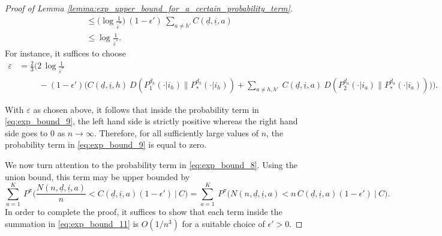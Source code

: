 \begin{proof}[Proof of Lemma \ref{lemma:exp_upper_bound_for_a_certain_probability_term}]
\begin{align}
	& \leq \bigg(\log\frac{1}{\bar{\varepsilon}^*}\bigg)~(1-\epsilon')~\sum\limits_{a\neq h'}C(\underline{d}, \underline{i}, a)\nonumber\\
	&\leq \log\frac{1}{\bar{\varepsilon}^*}.
\end{align}
For instance, it suffices to choose
\begin{align}
	\varepsilon&=\frac{2}{3}\bigg(2\,\log\frac{1}{\bar{\varepsilon}^*}\nonumber\\
	&\hspace{1cm}-(1-\epsilon')\bigg(C(\underline{d}, \underline{i}, h)~D(P_1^{d_h}(\cdot|i_h)\|P_*^{d_h}(\cdot|i_h))+\sum\limits_{a\neq h, h'}~C(\underline{d}, \underline{i}, a)~D(P_2^{d_a}(\cdot|i_a)\|P_*^{d_a}(\cdot|i_a))\bigg)\bigg).
	\label{eq:equation_defining_varepsilon}
\end{align}

With $\varepsilon$ as chosen above, it follows that inside the probability term in \eqref{eq:exp_bound_9}, the left hand side is strictly positive whereas the right hand side goes to $0$ as $n\to \infty$. Therefore, for all sufficiently large values of $n$, the probability term in \eqref{eq:exp_bound_9} is equal to zero.

We now turn attention to the probability term in \eqref{eq:exp_bound_8}. Using the union bound, this term may be upper bounded by
\begin{equation}
	\sum\limits_{a=1}^{K}~P^\pi\bigg(\frac{N(n, \underline{d}, \underline{i}, a)}{n} < C(\underline{d}, \underline{i}, a)(1-\epsilon')~\bigg|~C\bigg)=\sum\limits_{a=1}^{K}~P^\pi\bigg(N(n, \underline{d}, \underline{i}, a) < n\,C(\underline{d}, \underline{i}, a)(1-\epsilon')~\bigg|~C\bigg).
	\label{eq:exp_bound_11}
\end{equation}
In order to complete the proof, it suffices to show that each term inside the summation in \eqref{eq:exp_bound_11} is $O(1/n^3)$ for a suitable choice of $\epsilon'>0$.


\end{proof}
